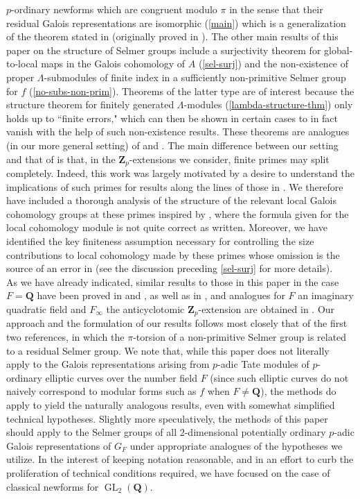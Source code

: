 \documentclass[12 pt]{amsart}
\theoremstyle{plain}
\theoremstyle{definition}
\numberwithin{equation}{section}
\numberwithin{table}{section}
\begin{document}
$p$-ordinary newforms which are congruent modulo $\pi$ in the sense that their residual Galois representations are isomorphic (\cref{main}) which is a generalization of the theorem stated in \cite[p. 237]{Gr10} (originally proved in \cite{GV00}). The other main results of this paper on the structure of Selmer groups include a surjectivity theorem for global-to-local maps in the Galois cohomology of $A$ (\cref{sel-surj}) and the non-existence of proper $\Lambda$-submodules of finite index in a sufficiently non-primitive Selmer group for $f$ (\cref{no-subs-non-prim}). Theorems of the latter type are of interest because the structure theorem for finitely generated $\Lambda$-modules (\cref{lambda-structure-thm}) only holds up to ``finite errors," which can then be shown in certain cases to in fact vanish with the help of such non-existence results. These theorems are analogues (in our more general setting) of \cite[Proposition 2.1]{GV00} and \cite[Proposition 2.5]{GV00}. The main difference between our setting and that of \cite{GV00} is that, in the $\mathbf{Z}_p$-extensions we consider, finite primes may split completely. Indeed, this work was largely motivated by a desire to understand the implications of such primes for results along the lines of those in \cite{GV00}. We therefore have included a thorough analysis of the structure of the relevant local Galois cohomology groups at these primes inspired by \cite[Lemma 3.2]{PW11}, where the formula given for the local cohomology module is not quite correct as written. Moreover, we have identified the key finiteness assumption necessary for controlling the size contributions to local cohomology made by these primes whose omission is the source of an error in \cite[Proposition A.2]{PW11} (see the discussion preceding \cref{sel-surj} for more details). \\%
\indent As we have already indicated, similar results to those in this paper in the case $F=\mathbf{Q}$ have been proved in \cite{GV00} and \cite{Gr10}, as well as in \cite{EPW}, and analogues for $F$ an imaginary quadratic field and $F_\infty$ the anticyclotomic $\mathbf{Z}_p$-extension are obtained in \cite{PW11}. Our approach and the formulation of our results follows most closely that of the first two references, in which the $\pi$-torsion of a non-primitive Selmer group is related to a residual Selmer group. We note that, while this paper does not literally apply to the Galois representations arising from $p$-adic Tate modules of $p$-ordinary elliptic curves over the number field $F$ (since such elliptic curves do not naively correspond to modular forms such as $f$ when $F\neq\mathbf{Q}$), the methods do apply to yield the naturally analogous results, even with somewhat simplified technical hypotheses. Slightly more speculatively, the methods of this paper should apply to the Selmer groups of all $2$-dimensional potentially ordinary $p$-adic Galois representations of $G_F$ under appropriate analogues of the hypotheses we utilize. In the interest of keeping notation reasonable, and in an effort to curb the proliferation of technical conditions required, we have focused on the case of classical newforms for $\operatorname{GL}_2(\mathbf{Q})$.\\%
\end{document}
